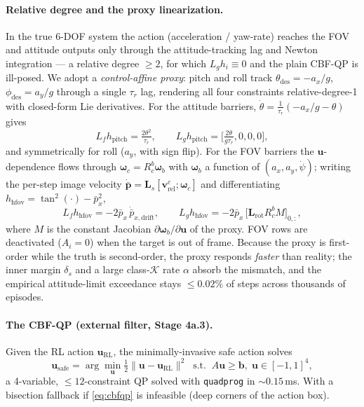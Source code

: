 \documentclass[11pt]{article}
\begin{document}
\paragraph{Relative degree and the proxy linearization.} In the true 6-DOF
system the action (acceleration / yaw-rate) reaches the FOV and attitude
outputs only through the attitude-tracking lag and Newton integration --- a
relative degree $\ge2$, for which $L_g h_i\equiv0$ and the plain CBF-QP is
ill-posed. We adopt a \emph{control-affine proxy}: pitch and roll track
$\theta_\text{des}=-a_x/g$, $\phi_\text{des}=a_y/g$ through a single
$\tau_r$ lag, rendering all four constraints relative-degree-1 with
closed-form Lie derivatives. For the attitude barriers,
$\dot\theta=\tfrac1{\tau_r}(-a_x/g-\theta)$ gives
\begin{equation}
L_f h_\text{pitch}=\tfrac{2\theta^2}{\tau_r},\qquad
L_g h_\text{pitch}=\Big[\tfrac{2\theta}{g\tau_r},0,0,0\Big],
\end{equation}
and symmetrically for roll ($a_y$, with sign flip). For the FOV barriers the
$\mathbf u$-dependence flows through $\bm\omega_c=R_c^b\bm\omega_b$ with
$\bm\omega_b$ a function of $(a_x,a_y,\dot\psi)$; writing the per-step image
velocity $\dot{\bar{\mathbf p}}=\mathbf L_s[\mathbf v_\text{rel}^c;\bm\omega_c]$
and differentiating $h_\text{hfov}=\tan^2(\cdot)-\bar p_x^2$,
\begin{equation}
L_f h_\text{hfov}=-2\bar p_x\,\dot{\bar p}_{x,\text{drift}},\qquad
L_g h_\text{hfov}=-2\bar p_x\,\big[\mathbf L_\text{rot}R_c^b M\big]_{0,:},
\end{equation}
where $M$ is the constant Jacobian $\partial\bm\omega_b/\partial\mathbf u$ of
the proxy. FOV rows are deactivated ($A_i{=}0$) when the target is out of
frame. Because the proxy is first-order while the truth is second-order, the
proxy responds \emph{faster} than reality; the inner margin $\delta_s$ and a
large class-$\mathcal K$ rate $\alpha$ absorb the mismatch, and the empirical
attitude-limit exceedance stays $\le0.02\%$ of steps across thousands of
episodes.

\paragraph{The CBF-QP (external filter, Stage 4a.3).} Given the RL action
$\mathbf u_\text{RL}$, the minimally-invasive safe action solves
\begin{equation}
\mathbf u_\text{safe}=\arg\min_{\mathbf u}\tfrac12\lVert\mathbf u-\mathbf u_\text{RL}\rVert^2
\;\;\text{s.t.}\;\; A\mathbf u\ge\mathbf b,\;\mathbf u\in[-1,1]^4,
\label{eq:cbfqp}
\end{equation}
a 4-variable, $\le12$-constraint QP solved with \texttt{quadprog} in
$\sim0.15\,$ms. With a bisection fallback if \eqref{eq:cbfqp} is infeasible
(deep corners of the action box).
\end{document}
